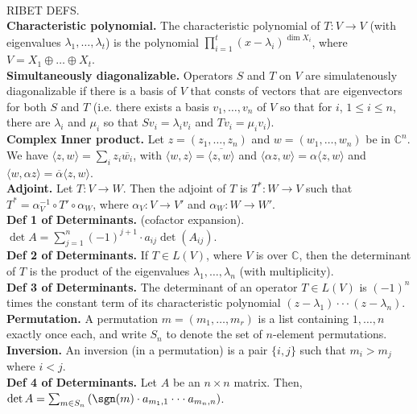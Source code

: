 	\\ RIBET DEFS. 
	\\ \textbf{Characteristic polynomial. } The characteristic polynomial of $T: V \to V$ (with eigenvalues $\lambda_1,\dots,\lambda_t$) is the polynomial $\prod_{i=1}^{t} (x-\lambda_i)^{\dim X_i}$, where $V = X_1 \oplus \dots \oplus X_t$. 
	\\ \textbf{Simultaneously diagonalizable. } Operators $S$ and $T$ on $V$ are simulatenously diagonalizable if there is a basis of $V$ that consts of vectors that are eigenvectors for both $S$ and $T$ (i.e. there exists a basis $v_1,\dots,v_n$ of $V$ so that for $i$, $1 \leq i \leq n$, there are $\lambda_i$ and $\mu_i$ so that $Sv_i = \lambda_iv_i$ and $Tv_i = \mu_iv_i$). 
	\\ \textbf{Complex Inner product. } Let $z=(z_1,\dots,z_n)$ and $w=(w_1,\dots,w_n)$ be in $\mathbb{C}^n$. We have $\langle z, w \rangle = \sum_{i} z_i \overline{w_i}$, with $\langle w, z \rangle = \overline{\langle z, w \rangle}$ and $\langle \alpha z, w \rangle = \alpha \langle z, w \rangle$ and $\langle w, \alpha z \rangle = \overline{\alpha}\langle z, w \rangle$. 
	\\ \textbf{Adjoint. } Let $T: V \to W$. Then the adjoint of $T$ is $T^*: W \to V$ such that $T^* = \alpha_V^{-1} \circ T' \circ \alpha_W$, where $\alpha_V: V \to V'$ and $\alpha_W: W \to W'$. 
	\\ \textbf{Def 1 of Determinants. } (cofactor expansion). $\det A = \sum_{j=1}^n (-1)^{j+1} \cdot a_{ij} \det (A_{ij})$. 
	\\ \textbf{Def 2 of Determinants. } If $T \in L(V)$, where $V$ is over $\mathbb{C}$, then the determinant of $T$ is the product of the eigenvalues $\lambda_1,\dots,\lambda_n$ (with multiplicity). 
	\\ \textbf{Def 3 of Determinants. } The determinant of an operator $T \in L(V)$ is $(-1)^n$ times the constant term of its characteristic polynomial $(z-\lambda_1) \cdot \cdot \cdot (z-\lambda_n)$. 
	\\ \textbf{Permutation. } A permutation $m=(m_1,\dots,m_r)$ is a list containing $1,\dots,n$ exactly once each, and write $S_n$ to denote the set of $n$-element permutations. 
	\\ \textbf{Inversion. } An inversion (in a permutation) is a pair $\{i,j\}$ such that $m_i > m_j$ where $i < j$. 
	\\ \textbf{Def 4 of Determinants. } Let $A$ be an $n \times n$ matrix. Then, $\det A = \sum_{m \in S_n} \left(\sgn(m) \cdot a_{m_1,1} \cdot \cdot \cdot a_{m_n,n}\right)$. 
